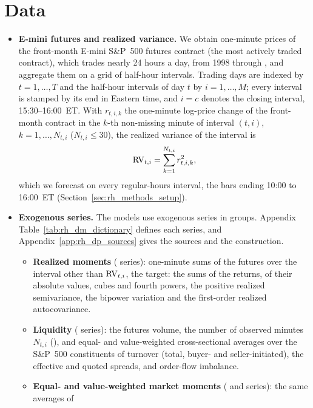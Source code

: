 

\section{Data}
\label{sec:rh_data}
\begin{itemize}
\item \textbf{E-mini futures and realized variance.} We obtain one-minute prices of the front-month E-mini S\&P~500
  futures contract (the most actively traded contract), which trades nearly 24 hours a day, from 1998 through
  \rhdsSampleEnd, and aggregate them on a grid of half-hour intervals. Trading days are indexed by $t = 1, \dots, T$
  and the half-hour intervals of day $t$ by $i = 1, \dots, M$; every interval is stamped by its end in Eastern time,
  and $i = c$ denotes the closing interval, 15:30--16:00~ET. With $r_{t,i,k}$ the one-minute log-price change of the
  front-month contract in the $k$-th non-missing minute of interval $(t,i)$, $k = 1, \dots, N_{t,i}$
  ($N_{t,i} \le 30$), the realized variance of the interval is \citep{AndersenBollerslevDieboldLabys2003}
  \[
    \mathrm{RV}_{t,i} = \sum_{k=1}^{N_{t,i}} r_{t,i,k}^2 ,
  \]
  which we forecast on every regular-hours interval, the bars ending 10:00 to 16:00~ET
  (Section~\ref{sec:rh_methods_setup}).
\item \textbf{Exogenous series.} The models use \rhdmNSeriesPooled{} exogenous series in \bkNBuckets{} groups.
  Appendix Table~\ref{tab:rh_dm_dictionary} defines each series, and Appendix~\ref{app:rh_dp_sources} gives the
  sources and the construction.
  \begin{itemize}
  \item \textbf{Realized moments} (\bkSizeMom{} series): one-minute sums of the futures over the interval other than
    $\mathrm{RV}_{t,i}$, the target: the sums of the returns, of their absolute values, cubes and fourth powers, the positive
    realized semivariance, the bipower variation and the first-order realized autocovariance.
  \item \textbf{Liquidity} (\bkSizeLiq{} series): the futures volume, the number of observed minutes
    $N_{t,i}$\ifrawseries{} ()\fi, and equal- and value-weighted cross-sectional averages over the
    S\&P~500 constituents of turnover (total, buyer- and seller-initiated), the effective and quoted spreads, and
    order-flow imbalance.
  \item \textbf{Equal- and value-weighted market moments} (\bkSizeMew{} and \bkSizeMvw{} series): the same averages of

\end{itemize}
\end{itemize}
